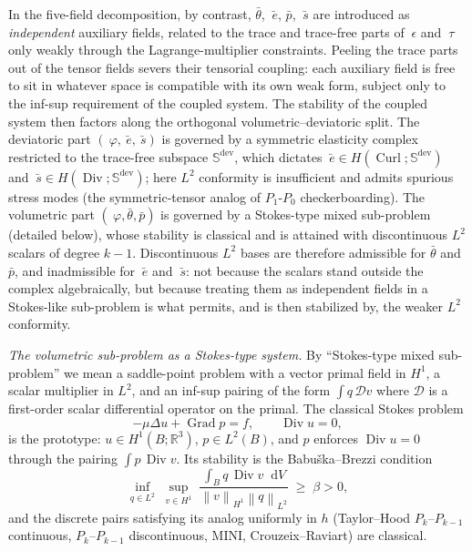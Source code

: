 \documentclass[12pt]{article}
\newcommand{\eps}{~\epsilon}
\newcommand{\ebar}{\bar{~e}}
\newcommand{\btau}{~\tau}
\newcommand{\sbar}{\bar{~s}}
\newcommand{\thbar}{\bar{\theta}}
\newcommand{\pbar}{\bar{p}}
\newcommand{\supdev}{^{\mathrm{dev}}}
\newcommand{\Symsd}{\mathbb{S}\supdev}
\newcommand{\norm}[1]{\left\lVert {#1} \right\rVert}
\DeclareMathOperator{\Div}{Div}
\DeclareMathOperator{\Grad}{Grad}
\DeclareMathOperator{\Curl}{Curl}
\newcommand*\diff{\mathop{}\!\mathrm{d}}
\begin{document}
In the five-field decomposition, by contrast, $\thbar$, $\ebar$,
$\pbar$, $\sbar$ are introduced as \emph{independent} auxiliary
fields, related to the trace and trace-free parts of $\eps$ and
$\btau$ only weakly through the Lagrange-multiplier constraints.
Peeling the trace parts out of the tensor fields severs their
tensorial coupling: each auxiliary field is free to sit in
whatever space is compatible with its own weak form, subject only
to the inf-sup requirement of the coupled system. The stability of the coupled system then factors along the
orthogonal volumetric--deviatoric split. The deviatoric part
$(~\varphi, \ebar, \sbar)$ is governed by a symmetric elasticity
complex restricted to the trace-free subspace $\Symsd$, which
dictates $\ebar \in H(\Curl; \Symsd)$ and $\sbar \in H(\Div;
\Symsd)$; here $L^2$ conformity is insufficient and admits
spurious stress modes (the symmetric-tensor analog of
$P_1$-$P_0$ checkerboarding). The volumetric part $(~\varphi,
\thbar, \pbar)$ is governed by a Stokes-type mixed sub-problem
(detailed below), whose stability is classical and is attained
with discontinuous $L^2$ scalars of degree $k-1$. Discontinuous
$L^2$ bases are therefore admissible for $\thbar$ and $\pbar$, and
inadmissible for $\ebar$ and $\sbar$: not because the scalars stand
outside the complex algebraically, but because treating them as
independent fields in a Stokes-like sub-problem is what permits,
and is then stabilized by, the weaker $L^2$ conformity.

\textit{The volumetric sub-problem as a Stokes-type system.} By
``Stokes-type mixed sub-problem'' we mean a saddle-point problem
with a vector primal field in $H^1$, a scalar multiplier in $L^2$,
and an inf-sup pairing of the form $\int q \,\mathcal{D} v$ where
$\mathcal{D}$ is a first-order scalar differential operator on the
primal. The classical Stokes problem
\begin{equation}
  \label{eq:stokes-classical}
  -\mu \Delta u + \Grad p = f,
  \qquad
  \Div u = 0,
\end{equation}
is the prototype: $u \in H^1(B; \mathbb{R}^3)$, $p \in L^2(B)$, and
$p$ enforces $\Div u = 0$ through the pairing $\int p \, \Div v$.
Its stability is the Babu\v{s}ka--Brezzi condition
\begin{equation}
  \label{eq:babuska-brezzi}
  \inf_{q \in L^2}\;\sup_{v \in H^1}\;
  \frac{\int_B q \, \Div v \diff V}
       {\norm{v}_{H^1} \norm{q}_{L^2}}
  \;\geq\; \beta > 0,
\end{equation}
and the discrete pairs satisfying its analog uniformly in $h$
(Taylor--Hood $P_k$--$P_{k-1}$ continuous, $P_k$--$P_{k-1}$
discontinuous, MINI, Crouzeix--Raviart) are classical.
\end{document}
